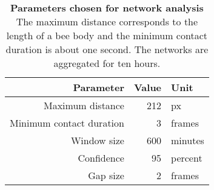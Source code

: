 \begin{table}[htbp]
\small
\centering
\caption[Parameters chosen for network analysis]{\textbf{Parameters chosen for network analysis} The maximum distance corresponds to the length of a bee body and the minimum contact duration is about one second. The networks are aggregated for ten hours.\\
}
\label{tab:chosenparams}

\begin{tabular}{rrl}
	\toprule
	\textbf{Parameter} & \textbf{Value} & \textbf{Unit} \\ \midrule
	Maximum distance & 212 & px \\
	Minimum contact duration & 3 & frames \\
	Window size & 600 & minutes \\ \midrule
	Confidence & 95 & percent \\
	Gap size & 2 & frames \\
	\bottomrule
\end{tabular}

\end{table}